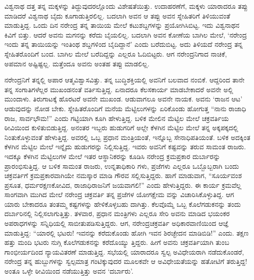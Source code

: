 ವಿಶ್ವನಾಥ ದತ್ತ ತನ್ನ ಮಕ್ಕಳನ್ನು ತಿದ್ದುವುದರಲ್ಲೊಂದು ವಿಶೇಷತೆಯಿತ್ತು. ಉದಾಹರಣೆಗೆ, ಮಕ್ಕಳು ಯಾರಾದರೂ ತಪ್ಪು ಮಾಡಿದರೆ ವಿಶ್ವನಾಥ ಬೈದು ಕೂಗಾಡುತ್ತಿರಲಿಲ್ಲ. ಬದಲಾಗಿ ಅವನ ಆ ತಪ್ಪು ಅವನ ಸ್ನೇಹಿತರಿಗೆ ತಿಳಿಯುವಂತೆ ಮಾಡುತ್ತಿದ್ದ. ಒಂದು ದಿನ ನರೇಂದ್ರ ತನ್ನ ತಾಯಿಯ ಮೇಲೆ ಕಟುಶಬ್ದಗಳನ್ನು ಪ್ರಯೋಗಿಸಿಬಿಟ್ಟ. ಇದು ವಿಶ್ವನಾಥನ ಕಿವಿಗೆ ಬಿತ್ತು. ಆದರೆ ಅವನು ಮಗನನ್ನು ಕರೆದು ಬೈಯಲಿಲ್ಲ. ಬದಲಾಗಿ ಅವನ ಕೋಣೆಯ ಬಾಗಿಲ ಮೇಲೆ, ‘ನರೇಂದ್ರ ಇಂದು ತನ್ನ ತಾಯಿಯನ್ನು ಇಂತಿಂಥ ಶಬ್ದಗಳಿಂದ ಬೈದಿದ್ದಾನೆ’ ಎಂದು ಬರೆದುಬಿಟ್ಟ. ಅದು ತಿಳಿಯದೆ ನರೇಂದ್ರ ತನ್ನ ಸ್ನೇಹಿತರೊಂದಿಗೆ ಬಂದ. ಬಾಗಿಲ ಮೇಲೆ ಬರೆದಿದ್ದನ್ನು ಎಲ್ಲರೂ ಓದಿಬಿಟ್ಟರು. ಆಗ ನರೇಂದ್ರನಿಗಾದ ನಾಚಿಕೆ, ಅಪಮಾನ ಅಷ್ಟಿಷ್ಟಲ್ಲ. ಮತ್ತೆಂದೂ ಅವನು ಅಂತಹ ತಪ್ಪು ಮಾಡಲಿಲ್ಲ.

ನರೇಂದ್ರನಿಗೆ ತನ್ನಲ್ಲಿ ಅಪಾರ ಆತ್ಮವಿಶ್ವಾಸವಿತ್ತು. ತನ್ನ ಬುದ್ಧಿಶಕ್ತಿಯಲ್ಲಿ ಅವನಿಗೆ ಬಲವಾದ ನಂಬಿಕೆ. ಆದ್ದರಿಂದ ತಾನೇ ತನ್ನ ಸಂಗಾತಿಗಳೆಲ್ಲರ ಮುಖಂಡನಂತೆ ವರ್ತಿಸುತ್ತಿದ್ದ. ಏನಾದರೂ ಕೆಲಸಕಾರ್ಯ ಮಾಡಬೇಕಾದರೆ ಅವನೇ ಅಲ್ಲಿ ಮುಂದಾಳು. ತಿರುಗಾಟಕ್ಕೆ ಹೊರಟರೆ ಅವನೇ ಮುಖಂಡ. ಆಡುವಾಗಲೂ ಅವನೇ ನಾಯಕ. ಅವನು ‘ರಾಜನ ಆಟ’ ಆಡುವುದನ್ನು ನೋಡ ಬೇಕು. ಸ್ನೇಹಿತರೊಂದಿಗೆ ಮನೆಯ ಮೆಟ್ಟಿಲುಗಳನ್ನು ಏರಿಕೊಂಡು ಹೋಗುತ್ತ “ನಾನು ರಾಜಾಧಿ ರಾಜ, ಸಾರ್ವಭೌಮ!” ಎಂದು ಗಟ್ಟಿಯಾಗಿ ಕೂಗಿ ಹೇಳುತ್ತಿದ್ದ. ಬಳಿಕ ಮೇಲಿನ ಮೆಟ್ಟಿಲ ಮೇಲೆ ಚಕ್ರವರ್ತಿಯ ಠೀವಿಯಿಂದ ಕುಳಿತುಬಿಡುತ್ತಿದ್ದ. ಅನಂತರ ಇಬ್ಬರು ಹುಡುಗರಿಗೆ ಅಲ್ಲೇ ಕೆಳಗಿನ ಮೆಟ್ಟಿಲ ಮೇಲೆ ತನ್ನ ಅಕ್ಕಪಕ್ಕದಲ್ಲಿ ನಿಂತುಕೊಳ್ಳುವಂತೆ ಹೇಳುತ್ತಿದ್ದ. ಅವರಲ್ಲಿ ಒಬ್ಬ ಪ್ರಧಾನ ಮಂತ್ರಿಯಂತೆ, ಇನ್ನೊಬ್ಬ ಸೇನಾಧಿಪತಿಯಂತೆ. ಬಳಿಕ ಅದಕ್ಕಿಂತ ಕೆಳಗಿನ ಮೆಟ್ಟಿಲ ಮೇಲೆ ಇನ್ನೈದು ಹುಡುಗರನ್ನು ನಿಲ್ಲಿಸುತ್ತಿದ್ದ. ಇವರು ಅವನಿಗೆ ಕಷ್ಟವನ್ನು ತರುವ ಸಾಮಂತ ರಾಜರು. ಇದಕ್ಕೂ ಕೆಳಗಿನ ಮೆಟ್ಟಿಲುಗಳ ಮೇಲೆ ಇತರ ಆಸ್ಥಾನಿಕರನ್ನು ಕೂಡಿಸಿ ನರೇಂದ್ರ ಕ್ರಮಪ್ರಕಾರ ದುರ್ಬಾರನ್ನು ಪ್ರಾರಂಭಿಸುತ್ತಿದ್ದ. ಆ ಬಳಿಕ ಸಾಮಂತ ರಾಜರು, ಉನ್ನತಾಧಿಕಾರಿ ಗಳು, ಪ್ರಜೆಗಳು ಎಲ್ಲರೂ ಒಬ್ಬೊಬ್ಬರಾಗಿ ಬಂದು ಚಕ್ರವರ್ತಿಗೆ ಕ್ರಮಪ್ರಕಾರವಾಗಿಯೇ ನಮಸ್ಕಾರ ಮಾಡಿ ಗೌರವ ಸಲ್ಲಿಸುತ್ತಿದ್ದರು. ಹಾಗೆ ಮಾಡುವಾಗ, “ಸೂರ್ಯವಂಶ ಪ್ರಸೂತ, ಧರ್ಮರಕ್ಷಣಕೋವಿದ, ರಾಜಾಧಿರಾಜನಿಗೆ ಜಯವಾಗಲಿ!” ಎಂದು ಹೇಳುತ್ತಿದ್ದರು. ಈ ಕಾರ್ಯ ಕ್ರಮವೆಲ್ಲ ಸಾಂಗವಾಗಿ ಮುಗಿದ ಮೇಲೆ ನರೇಂದ್ರ ಚಕ್ರವರ್ತಿ ತನ್ನ ಪ್ರಜೆಗಳ ಯೋಗಕ್ಷೇಮ ವನ್ನು ವಿಚಾರಿಸಿಕೊಳ್ಳುತಿದ್ದ. ಆಗ ಯಾರು ಬೇಕಾದರೂ ತಂತಮ್ಮ ಕಷ್ಟಗಳನ್ನು ಹೇಳಿಕೊಳ್ಳಬಹು ದಾಗಿತ್ತು. ಕೆಲವೊಮ್ಮೆ ಒಬ್ಬ ಕೊಲೆಗಡುಕನನ್ನು ತಂದು ದರ್ಬಾರಿನಲ್ಲಿ ನಿಲ್ಲಿಸಲಾಗುತ್ತಿತ್ತು. ತಳವಾರ, ಪ್ರಧಾನ ಮಂತ್ರಿಗಳು ಎಲ್ಲರೂ ಸೇರಿ ಅವನು ಮಾಡಿದ ಭಯಂಕರ ಅಪರಾಧಗಳನ್ನು ಸನ್ನಿಧಿಯಲ್ಲಿ ಸಾಬೀತುಪಡಿಸುತ್ತಿದ್ದರು. ಆಗ, ನರೇಂದ್ರಚಕ್ರವರ್ತಿ ಅಧಿಕಾರವಾಣಿಯಿಂದ ಆಜ್ಞೆ ಮಾಡುತ್ತಿದ್ದ: “ಯಾರಲ್ಲಿ ಭಟರು! ಇವನನ್ನು ಕರೆದುಕೊಂಡು ಹೋಗಿ ಇವನ ಶಿರಚ್ಛೇದನ ಮಾಡಿಬಿಡಿ!” ಎಂದು. ತಕ್ಷಣ ಹತ್ತು ಮಂದಿ ಭಟರು ನುಗ್ಗಿ ಕೊಲೆಗಡುಕನನ್ನು ಕರೆದೊಯ್ಯು ತ್ತಿದ್ದರು. ಹೀಗೆ ಅವನು ಚಕ್ರವರ್ತಿಯಾಗಿ ತುಂಬ ಗಾಂಭೀರ್ಯದಿಂದ ನ್ಯಾಯವಿತರಣೆ ಮಾಡುತ್ತಿದ್ದ. ಸಭೆಯಲ್ಲಿ ಯಾರಾದರೂ ಸ್ವಲ್ಪ ಅವಿಧೇಯರಾಗಿ ನಡೆದುಕೊಂಡರೆ, ನರೇಂದ್ರ ತನ್ನ ಹುಬ್ಬುಗಳನ್ನು ಸ್ವಲ್ಪಮಾತ್ರ ಗಂಟಿಕ್ಕುವುದರ ಮೂಲಕವೇ ಆ ಅವಿಧೇಯತೆಯನ್ನು ಹತೋಟಿಗೆ ತರುತ್ತಿದ್ದ! ಅಂತೂ ಒಳ್ಳೇ ಠೀವಿಯಿಂದ ನಡೆಯುತ್ತಿತ್ತು ಅವನ ‘ದರ್ಬಾರು’.


